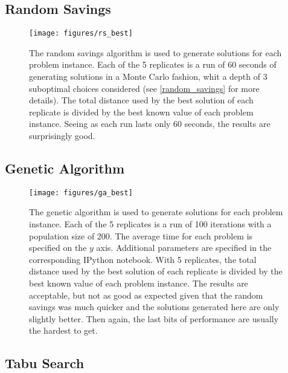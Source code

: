 \documentclass{article} %
\begin{document}
{\subsection{Random Savings}

\begin{figure}[!htb]
\begin{center}
 \texttt{[image: figures/rs\_best]}
 \caption{\small The random savings algorithm is used to generate solutions for each problem instance. Each of the 5 replicates is a run of 60 seconds of generating solutions in a Monte Carlo fashion, whit a depth of 3 suboptimal choices considered (see \ref{random_savings} for more details). The total distance used by the best solution of each replicate is divided by the best known value of each problem instance. Seeing as each run lasts only 60 seconds, the results are surprisingly good.}
 \label{rs_fig}
 \end{center}
\end{figure}


\newpage
\subsection{Genetic Algorithm}

\begin{figure}[!htb]
\begin{center}
 \texttt{[image: figures/ga\_best]}
 \caption{\small  The genetic algorithm is used to generate solutions for each problem instance. Each of the 5 replicates is a run of 100 iterations with a population size of 200. The average time for each problem is specified on the $y$ axis. Additional parameters are specified in the corresponding IPython notebook. With 5 replicates, the total distance used by the best solution of each replicate is divided by the best known value of each problem instance. The results are acceptable, but not as good as expected given that the random savings was much quicker and the solutions generated here are only slightly better. Then again, the last bits of performance are usually the hardest to get.}
 \label{ga_fig}
 \end{center}
\end{figure}


\newpage
\subsection{Tabu Search}

}
\end{document}
